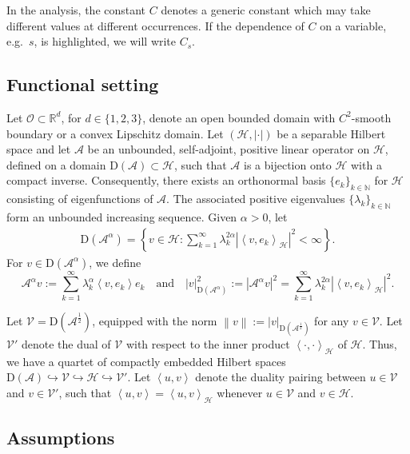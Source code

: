\documentclass[11pt, reqno]{amsart}
\theoremstyle{definition}
\numberwithin{equation}{section}
\newcommand{\bb}{\mathbb}
\newcommand{\norm}[1]{\left\|{#1}\right\|}
\newcommand{\inpro}[2]{\left\langle#1,#2\right\rangle}
\newcommand{\abs}[1]{\left|{#1}\right|}
\begin{document}
In the analysis, the constant $C$ denotes a
generic constant which may take different values at different occurrences. If the dependence of $C$ on a variable, e.g.~$s$, is highlighted, we will write $C_s$.



\subsection{Functional setting}
\label{subsec:fun set}

Let $\mathscr{O}\subset \bb{R}^d$, for $d\in \{1,2,3\}$, denote an open bounded domain with $C^2$-smooth boundary or a convex Lipschitz domain.
Let $(\mathcal{H}, \abs{\cdot})$ be a separable Hilbert space {and let} $\mathcal{A}$ be an unbounded, self-adjoint, positive linear operator on $\mathcal{H}$, defined on a domain $\mathrm{D}(\mathcal{A})\subset \mathcal{H}$, such that $\mathcal{A}$ is a bijection onto $\mathcal{H}$ with a compact inverse. Consequently, there exists an orthonormal basis $\{e_k\}_{k\in\bb{N}}$ for $\mathcal{H}$ consisting of eigenfunctions of $\mathcal{A}$. The associated positive eigenvalues $\{\lambda_k\}_{k\in\bb{N}}$ form an unbounded increasing sequence. Given $\alpha>0$, let
\begin{align*}
	\mathrm{D}(\mathcal{A}^\alpha) = \left\{v\in \mathcal{H} : \sum_{k=1}^\infty \lambda_k^{2\alpha} \abs{\inpro{v}{e_k}_\mathcal{H}}^2 < \infty\right\}.
\end{align*} 
For $v\in \mathrm{D}(\mathcal{A}^\alpha)$, we define
\[
\mathcal{A}^\alpha v:= \sum_{k=1}^\infty \lambda_k^{\alpha} \inpro{v}{e_k} e_k
\quad\text{and}\quad
\abs{v}_{\mathrm{D}(\mathcal{A}^\alpha)}^2:= \abs{\mathcal{A}^{\alpha} v}^2 = \sum_{k=1}^\infty \lambda_k^{2\alpha} \abs{\inpro{v}{e_k}_\mathcal{H}}^2.
\]

Let $\mathcal{V}=\mathrm{D}(\mathcal{A}^{\frac12})$, equipped with the norm $\norm{v}:= \abs{v}_{\mathrm{D}(\mathcal{A}^\frac12)}$ for any $v\in\mathcal{V}$. Let $\mathcal{V}'$ denote the dual of $\mathcal{V}$ with respect to the inner product $\inpro{\cdot}{\cdot}_\mathcal{H}$ of $\mathcal{H}$. Thus, we have a quartet of compactly embedded Hilbert spaces $\mathrm{D}(\mathcal{A}) \hookrightarrow \mathcal{V}\hookrightarrow \mathcal{H} \hookrightarrow \mathcal{V}'$. Let $\inpro{u}{v}$ denote the duality pairing between $u\in \mathcal{V}$ and $v\in \mathcal{V}'$, such that $\inpro{u}{v}=\inpro{u}{v}_{\mathcal{H}}$ whenever $u\in\mathcal{V}$ and $v\in \mathcal{H}$. 


\subsection{Assumptions}\label{sec:assum}
\end{document}
